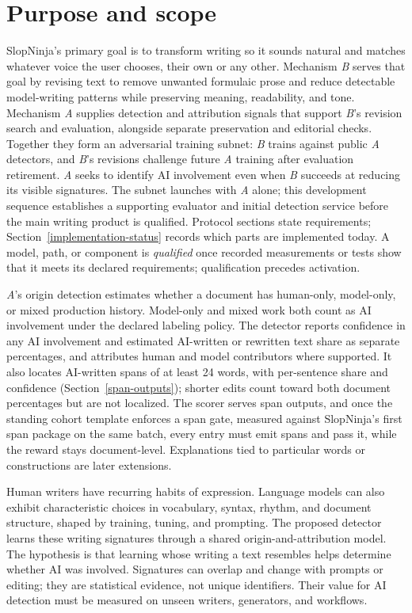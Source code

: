 \section{Purpose and scope}\label{purpose-and-scope}

SlopNinja's primary goal is to transform writing so it sounds natural and
matches whatever voice the user chooses, their own or any other. Mechanism
\textit{B} serves that goal by revising text to remove unwanted formulaic prose
and reduce detectable model-writing patterns while preserving meaning,
readability, and tone.
Mechanism \textit{A} supplies detection and attribution signals that support
\textit{B}'s revision search and evaluation, alongside separate preservation and
editorial checks. Together they form an adversarial training subnet:
\textit{B} trains against public \textit{A} detectors, and \textit{B}'s
revisions challenge future \textit{A} training after evaluation
retirement. \textit{A} seeks to identify AI involvement even when \textit{B}
succeeds at reducing its visible signatures.
The subnet launches with \textit{A} alone; this development
sequence establishes a supporting evaluator and initial detection service
before the main writing product is qualified. Protocol sections state
requirements; Section~\ref{implementation-status} records which parts are
implemented today. A model, path, or component is \emph{qualified} once
recorded measurements or tests show that it meets its declared requirements;
qualification precedes activation.

\textit{A}'s origin detection estimates whether a document has human-only,
model-only, or mixed production history. Model-only and mixed work both count
as AI involvement under the declared labeling policy. The detector reports
confidence in any AI involvement and estimated AI-written or rewritten text
share as separate percentages, and attributes human and model contributors
where supported. It also locates AI-written spans of at least 24 words, with
per-sentence share and confidence (Section~\ref{span-outputs}); shorter edits
count toward both document percentages but are not localized. The scorer
serves span outputs, and once the standing cohort template enforces a span
gate, measured against SlopNinja's first span package on the same batch, every
entry must emit spans and pass it, while the reward stays document-level. Explanations
tied to particular words or constructions are later extensions.

Human writers have recurring habits of expression. Language models can also
exhibit characteristic choices in vocabulary, syntax, rhythm, and document
structure, shaped by training, tuning, and prompting. The proposed detector
learns these writing signatures through a shared origin-and-attribution model.
The hypothesis is that learning whose writing a text resembles helps determine
whether AI was involved. Signatures can overlap and change with prompts or
editing; they are statistical evidence, not unique identifiers. Their value
for AI detection must be measured on unseen writers, generators, and workflows.

